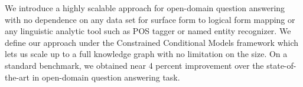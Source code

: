 We introduce a highly scalable approach for open-domain question answering with no dependence on any data set for surface form to logical form mapping or any linguistic analytic tool such as POS tagger or named entity recognizer. We define our approach under the Constrained Conditional Models framework which lets us scale up to a full knowledge graph with no limitation on the size. On a standard benchmark, we obtained near 4 percent improvement over the state-of-the-art in open-domain question answering task.
